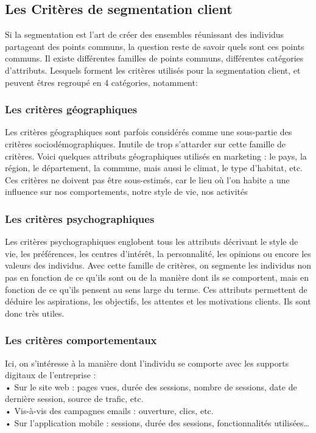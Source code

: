 \documentclass{article}
\begin{document}
\subsection{Les Critères de segmentation client}
Si la segmentation est l’art de créer des ensembles réunissant des individus partageant des points communs, la question reste de savoir quels sont ces points communs. Il existe différentes familles de points communs, différentes catégories d’attributs. Lesquels forment les critères utilisés pour la segmentation client, et peuvent êtres regroupé en 4 catégories, notamment:
\subsubsection{Les critères géographiques}
Les critères géographiques sont parfois considérés comme une sous-partie des critères sociodémographiques. Inutile de trop s’attarder sur cette famille de critères. Voici quelques attributs  géographiques  utilisés en marketing : le pays, la région, le département, la commune, mais aussi le climat, le type d’habitat, etc. Ces critères ne doivent pas être sous-estimés, car le lieu où l’on habite a une influence sur nos comportements, notre style de vie, nos activités
\subsubsection{Les critères psychographiques}
Les critères psychographiques englobent tous les attributs décrivant le style de vie, les préférences, les centres d’intérêt, la personnalité, les opinions ou encore les valeurs des individus. Avec cette famille de critères, on segmente les individus non pas en fonction de ce qu’ils sont ou de la manière dont ils se comportent, mais en fonction de ce qu’ils pensent au sens large du terme. Ces attributs permettent de déduire les aspirations, les objectifs, les attentes et les motivations clients. Ils sont donc très utiles.
\subsubsection{Les critères comportementaux}
Ici, on s’intéresse à la manière dont l’individu se comporte avec les supports digitaux de l’entreprise :
\\•	Sur le site web : pages vues, durée des sessions, nombre de sessions, date de dernière session, source de trafic, etc.
\\•	Vis-à-vis des campagnes emails : ouverture, clics, etc.
\\•	Sur l’application mobile : sessions, durée des sessions, fonctionnalités utilisées…
\end{document}
